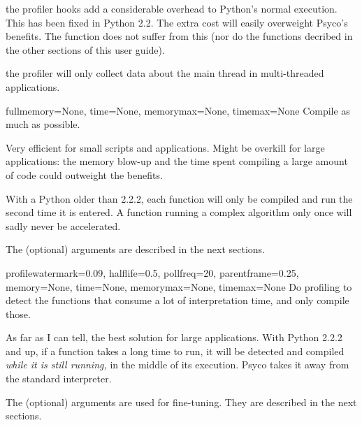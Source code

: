 \documentclass{manual}
\begin{document}
 the profiler hooks add a considerable overhead to Python's normal execution.  This has been fixed in Python 2.2.  The extra cost will easily overweight Psyco's benefits.  The function  does not suffer from this (nor do the functions decribed in the other sections of this user guide).

 the profiler will only collect data about the main thread in multi-threaded applications.

\begin{funcdesc}{full}{memory=None, time=None, memorymax=None, timemax=None}
  Compile as much as possible.

  Very efficient for small scripts and applications.  Might be overkill for large applications: the memory blow-up and the time spent compiling a large amount of code could outweight the benefits.

  With a Python older than 2.2.2, each function will only be compiled and run the second time it is entered.  A function running a complex algorithm only once will sadly never be accelerated.

  The (optional) arguments are described in the next sections.
\end{funcdesc}

\begin{funcdesc}{profile}{watermark=0.09, halflife=0.5, pollfreq=20, parentframe=0.25, memory=None, time=None, memorymax=None, timemax=None}
  Do profiling to detect the functions that consume a lot of interpretation time, and only compile those.

  As far as I can tell, the best solution for large applications.  With Python 2.2.2 and up, if a function takes a long time to run, it will be detected and compiled \emph{while it is still running,} in the middle of its execution.  Psyco takes it away from the standard interpreter.

  The (optional) arguments are used for fine-tuning.  They are described in the next sections.
\end{funcdesc}
\end{document}
